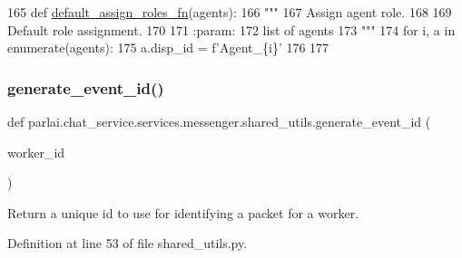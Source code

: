 \begin{DoxyCode}
165 \textcolor{keyword}{def }\hyperlink{namespaceparlai_1_1chat__service_1_1services_1_1messenger_1_1shared__utils_a41d97da08376040ba475b042eae5784c}{default\_assign\_roles\_fn}(agents):
166     \textcolor{stringliteral}{"""}
167 \textcolor{stringliteral}{    Assign agent role.}
168 \textcolor{stringliteral}{}
169 \textcolor{stringliteral}{    Default role assignment.}
170 \textcolor{stringliteral}{}
171 \textcolor{stringliteral}{    :param:}
172 \textcolor{stringliteral}{        list of agents}
173 \textcolor{stringliteral}{    """}
174     \textcolor{keywordflow}{for} i, a \textcolor{keywordflow}{in} enumerate(agents):
175         a.disp\_id = f\textcolor{stringliteral}{'Agent\_\{i\}'}
176 
177 
\end{DoxyCode}
\mbox{\label{namespaceparlai_1_1chat__service_1_1services_1_1messenger_1_1shared__utils_a0ecde97be784451ff38bc0cdce396e47}} 
\subsubsection{\texorpdfstring{generate\+\_\+event\+\_\+id()}{generate\_event\_id()}}
{\footnotesize\ttfamily def parlai.\+chat\+\_\+service.\+services.\+messenger.\+shared\+\_\+utils.\+generate\+\_\+event\+\_\+id (\begin{DoxyParamCaption}\item[{}]{worker\+\_\+id }\end{DoxyParamCaption})}

\begin{DoxyVerb}Return a unique id to use for identifying a packet for a worker.
\end{DoxyVerb}
 

Definition at line 53 of file shared\+\_\+utils.\+py.


